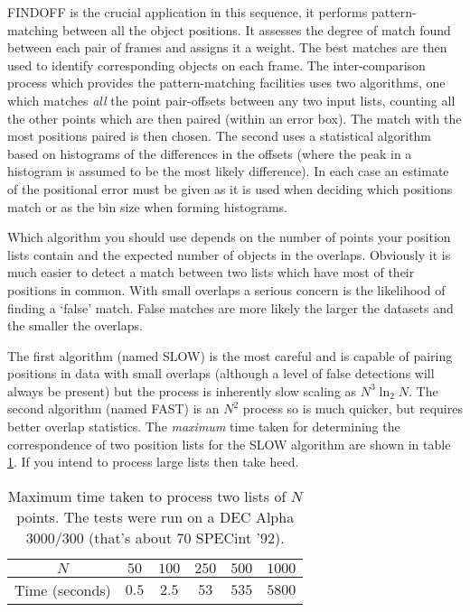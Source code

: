 \documentclass[twoside,11pt]{article}
\renewcommand{\_}{\texttt{\symbol{95}}}
\newcommand{\routine}[1]{{\sc #1}}
\begin{document}
\routine{FINDOFF} is the crucial application in this sequence, it performs
pattern-matching between all the object positions. It assesses the
degree of match found between each pair of frames and assigns it a
weight. The best matches are then used to identify corresponding objects
on each frame.  The inter-comparison process which provides the
pattern-matching facilities uses two algorithms, one which matches
{\em all} the point pair-offsets between any two input lists, counting
all the other points which are then paired (within an error box).  The
match with the most positions paired is then chosen. The second  uses a
statistical algorithm based on histograms of the differences in the
offsets (where the peak in a histogram is assumed to be the most likely
difference). In each case an estimate of the positional error must be
given as it is used when deciding which positions match or as the bin
size when forming histograms.

Which algorithm you should use depends on the number of points your
position lists contain and the expected number of objects in the
overlaps. Obviously it is much easier to detect a match between  two
lists which have most of their positions in common. With small overlaps
a serious concern is the likelihood of finding a `false' match. False
matches are more likely the larger the datasets and the smaller the
overlaps.

The first algorithm (named SLOW) is the most careful and is capable of
pairing positions in data with small overlaps (although a level of false
detections will always be present) but the process is inherently slow
scaling as $N^{3}\ln_{2}N$. The second algorithm (named FAST) is an
$N^2$ process so is much quicker, but requires better overlap
statistics. The {\em maximum} time taken for determining the
correspondence of two position lists for the SLOW algorithm are shown in
table \ref{table1}. If you intend to process large lists then take heed.

\begin{table}[htb]
\begin{center}
\begin{tabular}{|c|c|c|c|c|c|}
\hline
$N$ & $50$ & $100$ & $250$ & $500$ & $1000$\\
\hline
Time (seconds) &
     $0.5$ & $2.5$ & $53$ & $535$ & $5800$\\
\hline
\end{tabular}
\caption{
Maximum time taken to process two lists of $N$ points. The tests were
run on a DEC Alpha 3000/300 (that's about $70$ SPECint '92). 
\label{table1}}
\end{center}
\end{table}
\end{document}
